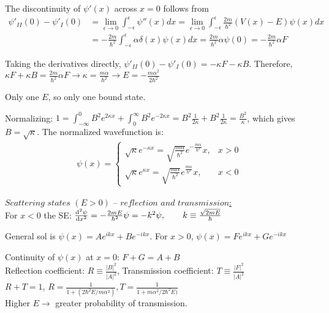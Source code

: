 The discontinuity of $\psi'(x)$ across $x=0$ follows from 
\begin{align*}
    \psi'_{II}(0) - \psi'_{I}(0) 
    &= \lim_{\epsilon \rightarrow 0} \int_{-\epsilon}^{\epsilon} \psi''(x) dx = \lim_{\epsilon \rightarrow 0} \int_{-\epsilon}^{\epsilon} \frac{2m}{\hbar^2} (V(x) - E) \psi(x) dx \\
    &= - \frac{2m}{\hbar^2} \int_{-\epsilon}^{\epsilon} \alpha \delta(x) \psi(x) dx = \frac{2m}{\hbar^2} \alpha \psi(0) = - \frac{2m}{\hbar^2} \alpha F
\end{align*}

Taking the derivatives directly, $\psi'_{II}(0) - \psi'_{I}(0) = -\kappa F - \kappa B$. Therefore,
    $\kappa F + \kappa B = \frac{2m}{\hbar^2} \alpha F \rightarrow \kappa = \frac{m \alpha}{\hbar^2} \rightarrow E = - \frac{m \alpha^2}{2 \hbar^2}$

Only one $E$, so only one bound state.

Normalizing: $1 = \int_{-\infty}^{0} B^2 e^{2 \kappa x} + \int_{0}^{\infty} B^2 e^{-2 \kappa x} = B^2 \frac{1}{2 \kappa} + B^2 \frac{1}{2 \kappa} = \frac{B^2}{\kappa}$, which gives $B = \sqrt{\kappa}$. 
The normalized wavefunction is: 
\begin{align*}
\psi(x) = 
    \begin{cases} 
        \sqrt{\kappa} e^{-\kappa x} = \sqrt{\frac{m\alpha}{\hbar^2}} e^{-\frac{m\alpha}{\hbar^2}} x, & x > 0 \\ 
        \sqrt{\kappa} e^{\kappa x} = \sqrt{\frac{m\alpha}{\hbar^2}} e^{\frac{m \alpha}{\hbar^2}} x, & x < 0
    \end{cases}
\end{align*}

\underline{$\textit{Scattering states } (E > 0) \textit{ -- reflection and transmission}$:} \\

For $x < 0$ the SE: $\dv[2]{\psi}{x} = -\frac{2mE}{\hbar^2} \psi = -k^2 \psi, \qquad k \equiv \frac{\sqrt{2mE}}{\hbar}$

General sol is $\psi(x) = Ae^{ikx} + Be^{-ikx}$.
For $x > 0$, $\psi(x) = Fe^{ikx} + Ge^{-ikx}$

Continuity of $\psi(x)$ at $x = 0$: $F+G=A+B$ \\

Reflection coefficient: $R \equiv \frac{|B|^2}{|A|^2}$, 
Transmission coefficient: $T \equiv \frac{|F|^2}{|A|^2}$ \\
$R + T = 1$, $R = \frac{1}{1+(2\hbar^2E/m \alpha^2)}, T = \frac{1}{1+m \alpha^2 / 2 \hbar^2 E)}$ \\
Higher $E \rightarrow$ greater probability of transmission.

